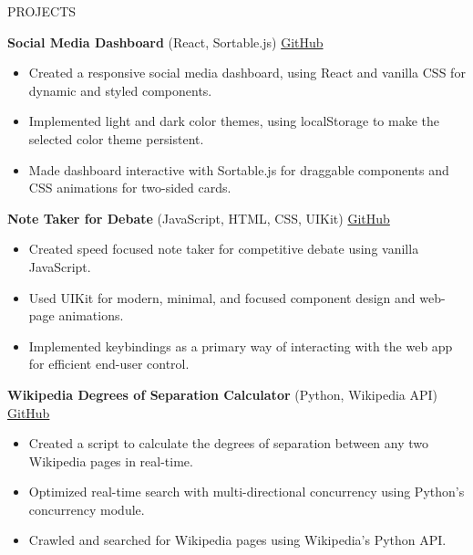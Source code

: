 \documentclass{resume} %
\begin{document}
\begin{rSection}{PROJECTS}
    \vspace{-1.25em}
    \item \textbf{Social Media Dashboard} {(React, Sortable.js)} \hfill \href{https://github.com/iandraves/SocialMediaDashboard}{GitHub}
    \begin{itemize}
        \itemsep -3pt {} 
        \item Created a responsive social media dashboard, using React and vanilla CSS for dynamic and styled components.
        \item Implemented light and dark color themes, using localStorage to make the selected color theme persistent.
        \item Made dashboard interactive with Sortable.js for draggable components and CSS animations for two-sided cards.
    \end{itemize}
    \item \textbf{Note Taker for Debate} {(JavaScript, HTML, CSS, UIKit)} \hfill \href{https://github.com/iandraves/Droplet}{GitHub}
    \begin{itemize}
        \itemsep -3pt {} 
        \item Created speed focused note taker for competitive debate using vanilla JavaScript. 
        \item Used UIKit for modern, minimal, and focused component design and web-page animations.
        \item Implemented keybindings as a primary way of interacting with the web app for efficient end-user control.
    \end{itemize}
    \item \textbf{Wikipedia Degrees of Separation Calculator} {(Python, Wikipedia API)} \hfill \href{https://github.com/iandraves/WikiWeb}{GitHub}
    \begin{itemize}
        \itemsep -3pt {} 
        \item Created a script to calculate the degrees of separation between any two Wikipedia pages in real-time.
        \item Optimized real-time search with multi-directional concurrency using Python's concurrency module.
        \item Crawled and searched for Wikipedia pages using Wikipedia's Python API.
    \end{itemize}

\end{rSection}
\end{document}
